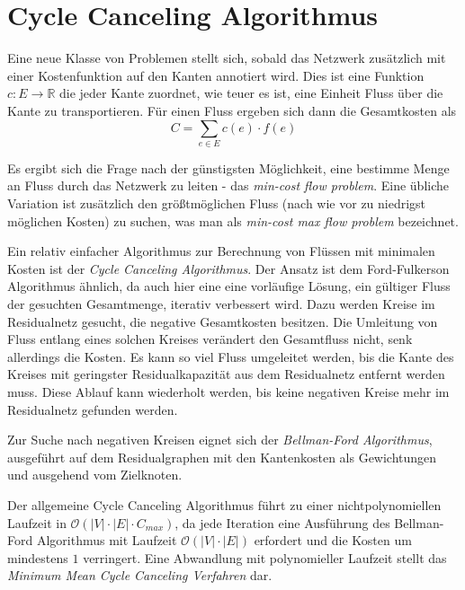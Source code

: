 \section{Cycle Canceling Algorithmus}

Eine neue Klasse von Problemen stellt sich, sobald das Netzwerk zusätzlich mit einer Kostenfunktion auf den Kanten annotiert wird. Dies ist eine Funktion $c: E \rightarrow \mathbb{R}$ die jeder Kante zuordnet, wie teuer es ist, eine Einheit Fluss über die Kante zu transportieren. Für einen Fluss ergeben sich dann die Gesamtkosten als
\[C = \sum_{e \in E} c(e) \cdot f(e)\]

Es ergibt sich die Frage nach der günstigsten Möglichkeit, eine bestimme Menge an Fluss durch das Netzwerk zu leiten - das \emph{min-cost flow problem}. Eine übliche Variation ist zusätzlich den größtmöglichen Fluss (nach wie vor zu niedrigst möglichen Kosten) zu suchen, was man als \emph{min-cost max flow problem} bezeichnet.

Ein relativ einfacher Algorithmus zur Berechnung von Flüssen mit minimalen Kosten ist der \emph{Cycle Canceling Algorithmus}.\cite{cycle_canceling} Der Ansatz ist dem Ford-Fulkerson Algorithmus ähnlich, da auch hier eine eine vorläufige Lösung, ein gültiger Fluss der gesuchten Gesamtmenge, iterativ verbessert wird. Dazu werden Kreise im Residualnetz gesucht, die negative Gesamtkosten besitzen. Die Umleitung von Fluss entlang eines solchen Kreises verändert den Gesamtfluss nicht, senk allerdings die Kosten. Es kann so viel Fluss umgeleitet werden, bis die Kante des Kreises mit geringster Residualkapazität aus dem Residualnetz entfernt werden muss. Diese Ablauf kann wiederholt werden, bis keine negativen Kreise mehr im Residualnetz gefunden werden.

Zur Suche nach negativen Kreisen eignet sich der \emph{Bellman-Ford Algorithmus}, ausgeführt auf dem Residualgraphen mit den Kantenkosten als Gewichtungen und ausgehend vom Zielknoten. 

Der allgemeine Cycle Canceling Algorithmus führt zu einer nichtpolynomiellen Laufzeit in $\mathcal{O}\left(|V|\cdot |E|\cdot C_{max}\right)$, da jede Iteration eine Ausführung des Bellman-Ford Algorithmus mit Laufzeit $\mathcal{O}\left(|V|\cdot |E|\right)$ erfordert und die Kosten um mindestens $1$ verringert. Eine Abwandlung mit polynomieller Laufzeit stellt das \emph{Minimum Mean Cycle Canceling Verfahren} dar.\cite{min_mean_cycle_canceling}

